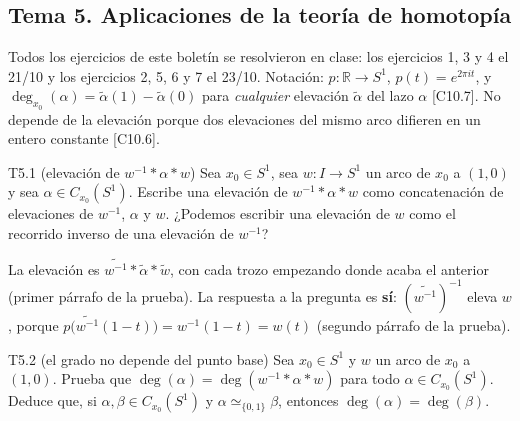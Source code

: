 \subsection{Tema 5. Aplicaciones de la teoría de homotopía}

Todos los ejercicios de este boletín se resolvieron en clase: los ejercicios 1, 3 y 4 el 21/10 y los ejercicios 2, 5, 6 y 7 el 23/10. Notación: $p \colon \mathbb{R} \to S^1$, $p(t) = e^{2\pi i t}$, y $\deg_{x_0}(\alpha) = \tilde\alpha(1) - \tilde\alpha(0)$ para \emph{cualquier} elevación $\tilde\alpha$ del lazo $\alpha$ [C10.7]. No depende de la elevación porque dos elevaciones del mismo arco difieren en un entero constante [C10.6].

\begin{ejercicio}{T5.1 (elevación de $w^{-1} * \alpha * w$)}
Sea $x_0 \in S^1$, sea $w \colon I \to S^1$ un arco de $x_0$ a $(1,0)$ y sea $\alpha \in C_{x_0}(S^1)$. Escribe una elevación de $w^{-1} * \alpha * w$ como concatenación de elevaciones de $w^{-1}$, $\alpha$ y $w$. ¿Podemos escribir una elevación de $w$ como el recorrido inverso de una elevación de $w^{-1}$?

 La elevación es $\widetilde{w^{-1}} * \tilde\alpha * \tilde w$, con cada trozo empezando donde acaba el anterior (primer párrafo de la prueba). La respuesta a la pregunta es \textbf{sí}: $(\widetilde{w^{-1}})^{-1}$ eleva $w$, porque $p\big(\widetilde{w^{-1}}(1-t)\big) = w^{-1}(1-t) = w(t)$ (segundo párrafo de la prueba).
\end{ejercicio}

\begin{ejercicio}{T5.2 (el grado no depende del punto base)}
Sea $x_0 \in S^1$ y $w$ un arco de $x_0$ a $(1,0)$. Prueba que $\deg(\alpha) = \deg(w^{-1} * \alpha * w)$ para todo $\alpha \in C_{x_0}(S^1)$. Deduce que, si $\alpha, \beta \in C_{x_0}(S^1)$ y $\alpha \simeq_{\{0,1\}} \beta$, entonces $\deg(\alpha) = \deg(\beta)$.

\end{ejercicio}

